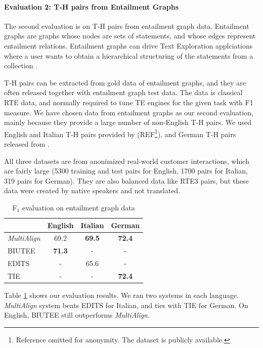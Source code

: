 \documentclass[11pt,letterpaper]{article}
\begin{document}
\paragraph{Evaluation 2: T-H pairs from Entailment Graphs} The second 
evaluation is on T-H pairs from entailment graph data. Entailment
graphs are graphs whose nodes are sets of statements, and whose edges
represent entailment relations. Entailment graphs can drive Text
Exploration applciations where a user wants to obtain a hierarchical
structuring of the statements from a collection \cite{berant2012learning}.   

T-H pairs can be extracted from gold data of entailment graphs, and
they are often released together with entailment graph test data. The
data is classical RTE data, and normally required to tune TE engines
for the given task with F1 measure. We have chosen data from
entailment graphs as our second evaluation, mainly because they
provide a large number of non-English T-H pairs. We used English and
Italian T-H pairs provided by (REF\footnote{Reference omitted for
anonymity. The dataset is publicly available.}), and German T-H pairs
released from \cite{Eichler:2014}.       

All three datasets are from anonimized real-world customer
interactions, which are fairly large (5300 training and test pairs for
English, 1700 pairs for Italian, 319 pairs for German). They are also
balanced data like RTE3 pairs, but these data were created by native
speakers and not translated.

\begin{table}[t!]
\centering
\small
\begin{tabular}{l|ccc}
              &   English    &   Italian   &  German  \\
\hline
{\em MultiAlign}&   69.2     &   \textbf{69.5}    &   \textbf{72.4}  \\
BIUTEE        &   \textbf{71.3}     &     -       &     -     \\
EDITS         &      -       &   65.6    &     -     \\
TIE           &      -       &     -       &   \textbf{72.4}  \\ 
\end{tabular}
\caption{F$_1$ evaluation on entailment graph data}
\label{table:egraph}
\end{table}

Table \ref{table:egraph} shows our evaluation results. We ran two
systems in each language. {\it MultiAlign} system beats EDITS for
Italian, and ties with TIE for German. On English, BIUTEE still
outperforms {\it MultiAlign}.
\end{document}

